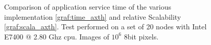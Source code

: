 \begin{figure}[p]
\centering
{}
\caption{ Comparison of application service time of the various implementation \ref{graf:time_axth} and relative Scalability \ref{graf:scala_axth}. Test performed on a set of 20 nodes with Intel E7400 @ 2.80 Ghz cpu. Images of $10^6$ 8bit pixels.}
\label{chart:axt}
\end{figure}

